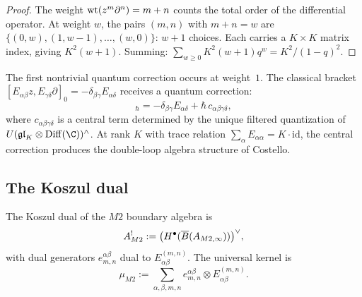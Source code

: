 \begin{proof}
The weight $\operatorname{wt}(z^m\partial^n) = m+n$ counts the total order of the
differential operator. At weight $w$, the pairs $(m,n)$ with
$m+n=w$ are $\{(0,w), (1,w-1), \ldots, (w,0)\}$: $w+1$ choices.
Each carries a $K \times K$ matrix index, giving $K^2(w+1)$.
Summing: $\sum_{w \ge 0} K^2(w+1)q^w = K^2/(1-q)^2$.
\end{proof}


\begin{computation}
The first nontrivial quantum correction occurs at weight~$1$.
The classical bracket $[E_{\alpha\beta}z, E_{\gamma\delta}\partial]_0
= -\delta_{\beta\gamma}E_{\alpha\delta}$ receives a quantum
correction:
\begin{equation}%
[E_{\alpha\beta}z, E_{\gamma\delta}\partial]_\hbar
= -\delta_{\beta\gamma}E_{\alpha\delta}
+ \hbar\, c_{\alpha\beta\gamma\delta},
\end{equation}
where $c_{\alpha\beta\gamma\delta}$ is a central term determined by
the unique filtered quantization of $U(\mathfrak{gl}_K \otimes
\Diff(\C))^\wedge$. At rank $K$ with trace relation
$\sum_\alpha E_{\alpha\alpha} = K \cdot \mathrm{id}$, the central
correction produces the double-loop algebra structure of Costello.
\end{computation}


\subsection{The Koszul dual}

\begin{definition}
\label{def:thqg-m2-koszul-dual}
The Koszul dual of the $M2$ boundary algebra is
\begin{equation}%
A^!_{M2} := \bigl(H^\bullet(\barB(A_{M2,\infty}))\bigr)^\vee,
\end{equation}
with dual generators $e^{\alpha\beta}_{m,n}$ dual to
$E^{(m,n)}_{\alpha\beta}$. The universal kernel is
\begin{equation}%
\mu_{M2}
:= \sum_{\alpha,\beta,m,n}
e^{\alpha\beta}_{m,n} \otimes E^{(m,n)}_{\alpha\beta}.
\end{equation}
\end{definition}

